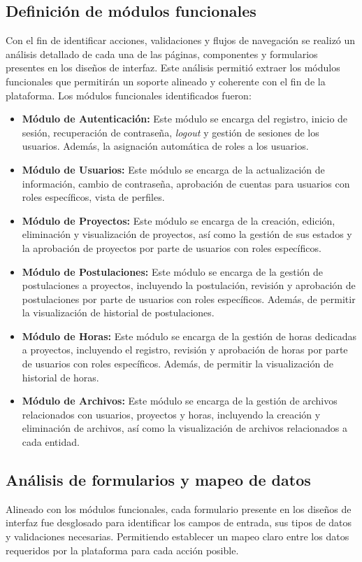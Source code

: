 \subsection{Definición de módulos funcionales}
Con el fin de identificar acciones, validaciones y flujos de navegación se realizó un análisis detallado
de cada una de las páginas, componentes y formularios presentes en los diseños de interfaz.
Este análisis permitió extraer los módulos funcionales que permitirán un soporte alineado y coherente con 
el fin de la plataforma.
Los módulos funcionales identificados fueron:
\begin{itemize}
    \item \textbf{Módulo de Autenticación:} Este módulo se encarga del registro, inicio de sesión, recuperación
            de contraseña, \textit{logout} y gestión de sesiones de los usuarios. Además, la asignación automática
            de roles a los usuarios.
    \item \textbf{Módulo de Usuarios:} Este módulo se encarga de la actualización de información, cambio de contraseña,
            aprobación de cuentas para usuarios con roles específicos, vista de perfiles. 
    \item \textbf{Módulo de Proyectos:} Este módulo se encarga de la creación, edición, eliminación y visualización de
            proyectos, así como la gestión de sus estados y la aprobación de proyectos por parte de usuarios con roles específicos.
    \item \textbf{Módulo de Postulaciones:} Este módulo se encarga de la gestión de postulaciones a proyectos, incluyendo
            la postulación, revisión y aprobación de postulaciones por parte de usuarios con roles específicos. Además, de
            permitir la visualización de historial de postulaciones.
    \item \textbf{Módulo de Horas:} Este módulo se encarga de la gestión de horas dedicadas a proyectos, incluyendo el registro,
            revisión y aprobación de horas por parte de usuarios con roles específicos. Además, de permitir la visualización de
            historial de horas.
    \item \textbf{Módulo de Archivos:} Este módulo se encarga de la gestión de archivos relacionados con usuarios, proyectos y
            horas, incluyendo la creación y eliminación de archivos, así como la visualización de archivos relacionados a cada entidad.
\end{itemize}

\subsection{Análisis de formularios y mapeo de datos}
Alineado con los módulos funcionales, cada formulario presente en los diseños de interfaz fue desglosado para identificar los
campos de entrada, sus tipos de datos y validaciones necesarias. Permitiendo establecer un mapeo claro entre los datos requeridos
por la plataforma para cada acción posible.

